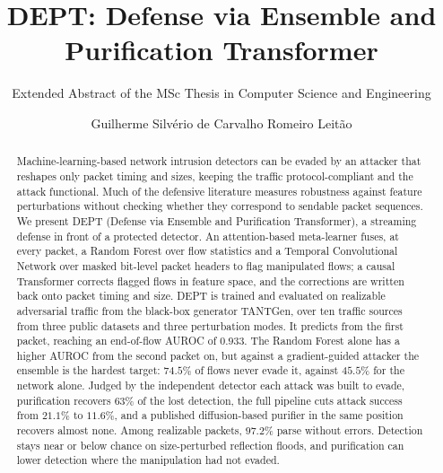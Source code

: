 \documentclass[acmtog,nonacm,pbalance]{acmart}
\begin{document}
\title[DEPT: Defense via Ensemble and Purification Transformer]{DEPT: Defense via Ensemble and Purification Transformer}
\subtitle{Extended Abstract of the MSc Thesis in Computer Science and Engineering}

\author{Guilherme Silvério de Carvalho Romeiro Leitão}

\renewcommand{\shortauthors}{G. Leitão}
\authorsaddresses{}

\begin{abstract}
Machine-learning-based network intrusion detectors can be evaded by an attacker
that reshapes only packet timing and sizes, keeping the traffic
protocol-compliant and the attack functional. Much of the defensive literature
measures robustness against feature perturbations without checking whether
they correspond to sendable packet sequences. We present DEPT (Defense
via Ensemble and Purification Transformer), a streaming defense in front of a
protected detector. An attention-based meta-learner fuses, at every packet,
a Random Forest over flow statistics and a Temporal Convolutional Network over
masked bit-level packet headers to flag manipulated flows; a causal
Transformer corrects flagged flows in feature space, and the corrections
are written back onto packet timing and size. DEPT is trained and evaluated on
realizable adversarial traffic from the black-box generator TANTGen, over ten
traffic sources from three public datasets and three perturbation modes. It
predicts from the first packet, reaching an end-of-flow AUROC of $0.933$.
The Random Forest alone has a higher AUROC from the second packet on, but
against a gradient-guided attacker the ensemble is the hardest target:
$74.5\%$ of flows never evade it, against $45.5\%$ for the network
alone. Judged by the independent detector each attack was built to evade,
purification recovers $63\%$ of the lost detection, the full pipeline cuts
attack success from $21.1\%$ to $11.6\%$, and a published diffusion-based
purifier in the same position recovers almost none. Among realizable packets,
$97.2\%$ parse without errors. Detection stays near or below chance on
size-perturbed reflection floods, and purification can lower detection where the
manipulation had not evaded.
\end{abstract}
\end{document}
